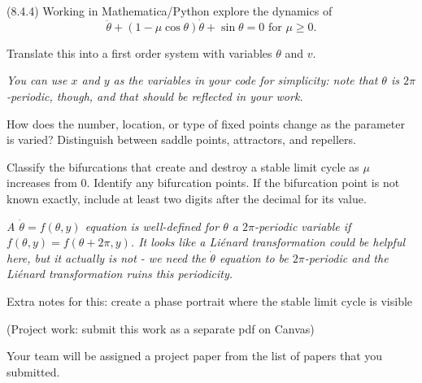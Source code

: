 \documentclass[12pt,letterpaper,answers]{exam}
\begin{document}
\begin{questions}

\question (8.4.4) Working in Mathematica/Python explore the dynamics of \[\ddot{\theta} + (1-\mu\cos\theta)\dot{\theta} + \sin\theta = 0 \text{ for } \mu \geq 0.\]
\begin{parts}
    \item Translate this into a first order system with variables $\theta$ and $v$. 
    
    \emph{You can use $x$ and $y$ as the variables in your code for simplicity: note that $\theta$ is $2\pi$-periodic, though, and that should be reflected in your work.}

    \item How does the number, location, or type of fixed points change as the parameter is varied?  Distinguish between saddle points, attractors, and repellers.
    
    \item Classify the bifurcations that create and destroy a stable limit cycle as $\mu$ increases from $0$.  Identify any bifurcation points.  If the bifurcation point is not known exactly, include at least two digits after the decimal for its value.
\end{parts}
 




\emph{A $\dot{\theta} = f(\theta, y)$ equation is well-defined for $\theta$ a $2\pi$-periodic variable if $f(\theta,y) = f(\theta+2\pi,y)$.  It looks like a Li\'enard transformation could be helpful here, but it actually is not - we need the $\dot{\theta}$ equation to be $2\pi$-periodic and the Li\'enard transformation ruins this periodicity.}

Extra notes for this: create a phase portrait where the stable limit cycle is visible



\question (Project work: submit this work as a separate pdf on Canvas)

Your team will be assigned a project paper from the list of papers that you submitted.  
\begin{parts}

\end{parts}
\end{questions}
\end{document}
